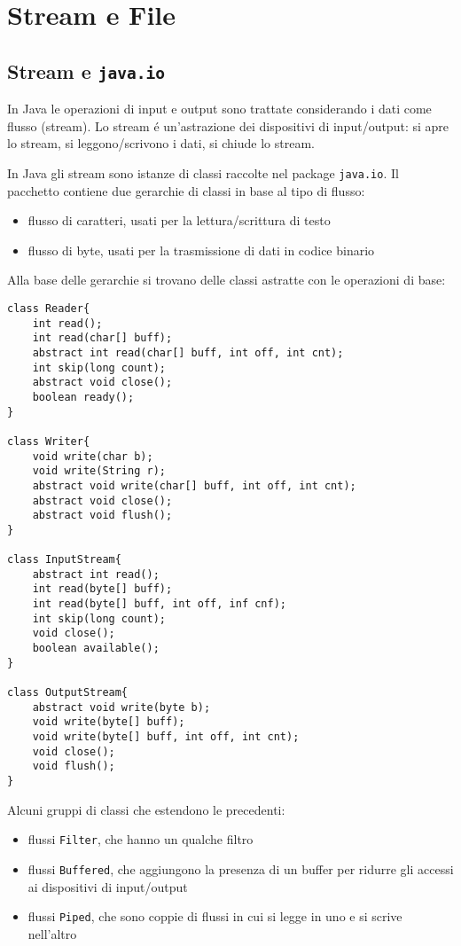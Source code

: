 \chapter{Stream e File}

\section{Stream e \texttt{java.io}}
In Java le operazioni di input e output sono trattate considerando i dati come flusso (stream). Lo stream é un'astrazione dei dispositivi di input/output: si apre lo stream, si leggono/scrivono i dati, si chiude lo stream.

In Java gli stream sono istanze di classi raccolte nel package \texttt{java.io}. Il pacchetto contiene due gerarchie di classi in base al tipo di flusso:
\begin{itemize}
 \item flusso di caratteri, usati per la lettura/scrittura di testo
 \item flusso di byte, usati per la trasmissione di dati in codice binario
\end{itemize}

Alla base delle gerarchie si trovano delle classi astratte con le operazioni di base:

\begin{lstlisting}
class Reader{
	int read();
	int read(char[] buff);
	abstract int read(char[] buff, int off, int cnt);
	int skip(long count);
	abstract void close();
	boolean ready();
}

class Writer{
	void write(char b);
	void write(String r);
	abstract void write(char[] buff, int off, int cnt);
	abstract void close();
	abstract void flush();
}

class InputStream{
	abstract int read();
	int read(byte[] buff);
	int read(byte[] buff, int off, inf cnf);
	int skip(long count);
	void close();
	boolean available();
}

class OutputStream{
	abstract void write(byte b);
	void write(byte[] buff);
	void write(byte[] buff, int off, int cnt);
	void close();
	void flush();
}
\end{lstlisting}

Alcuni gruppi di classi che estendono le precedenti:
\begin{itemize}
\item flussi \texttt{Filter}, che hanno un qualche filtro
\item flussi \texttt{Buffered}, che aggiungono la presenza di un buffer per ridurre gli accessi ai dispositivi di input/output
\item flussi \texttt{Piped}, che sono coppie di flussi in cui si legge in uno e si scrive nell'altro
\end{itemize}

